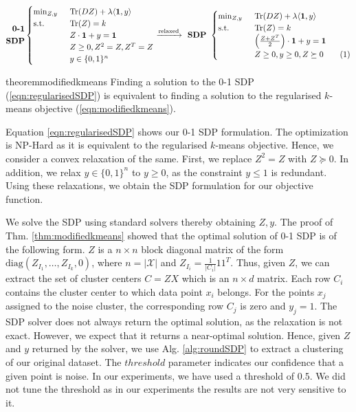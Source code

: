 \documentclass[12pt]{article}
\newcommand{\mc}{\mathcal}
\newcommand{\mb}{\mathbf}
\newcommand{\tr}{\text{Tr}}
\newcommand{\diag}{\text{diag}}
\newcommand\numberthis{\addtocounter{equation}{1}\tag{\theequation}}
\begin{document}
\begin{equation*}
	\begin{split}
	\textbf{0-1}\\
	\textbf{SDP}
  \end{split}
	\begin{cases}
		\min_{Z, y} \enspace &\tr(DZ) + \lambda \langle \mb 1, y\rangle\\
		\text{s.t. } \enspace &\tr(Z) = k\\
		& Z\cdot \mb 1 + y = \mb 1\\	
		&Z\ge 0, Z^2 = Z, Z^T = Z \\
		& y \in \{0, 1\}^n
	\end{cases}
	\xrightarrow{\text{relaxed}} \textbf{ SDP } 
	\begin{cases}
		\min_{Z, y} \enspace &\tr(DZ) + \lambda \langle \mb 1, y\rangle\\
        \text{s.t. } \enspace &\tr(Z) = k\\
		& \Big(\frac{Z+Z^T}{2}\Big)\cdot \mb 1 + y = \mb 1\\		
		&Z \ge 0, y \ge 0, Z \succeq 0 \numberthis\label{eqn:regularisedSDP}
	\end{cases}
\end{equation*}

\begin{restatable}{theorem}{modifiedkmeans}
\label{thm:modifiedkmeans}
Finding a solution to the 0-1 SDP (\ref{eqn:regularisedSDP}) is equivalent to finding a solution to the regularised $k$-means objective (\ref{eqn:modifiedkmeans}). 
\end{restatable}

Equation \ref{eqn:regularisedSDP} shows our 0-1 SDP formulation. The optimization is NP-Hard as it is equivalent to the regularised $k$-means objective. Hence, we consider a convex relaxation of the same. First, we replace $Z^2 = Z$ with $Z \succeq 0$. In addition, we relax $y \in \{0, 1\}^n$ to $y \geq 0$, as the constraint $y\leq 1$ is redundant. Using these relaxations, we obtain the SDP formulation for our objective function.

We solve the SDP using standard solvers \cite{yang2015sdpnal+} thereby obtaining $Z, y$. 
The proof of Thm. \ref{thm:modifiedkmeans} showed that the optimal solution of 0-1 SDP is of the following form. $Z$ is a $n\times n$ block diagonal matrix of the form $\diag(Z_{I_1}, \ldots, Z_{I_k}, 0)$, where $n = |\mc X|$ and $Z_{I_i} = \frac{1}{|C_i|}11^T$. Thus, given $Z$, we can extract the set of cluster centers $C = ZX$ which is an $n \times d$ matrix. Each row $C_i$ contains the cluster center to which data point $x_i$ belongs. For the points $x_j$ assigned to the noise cluster, the corresponding row $C_j$ is zero and $y_j = 1$. The SDP solver does not always return the optimal solution, as the relaxation is not exact. However, we expect that it returns a near-optimal solution. Hence, given $Z$ and $y$ returned by the solver, we use Alg. \ref{alg:roundSDP} to extract a clustering of our original dataset. The $threshold$ parameter indicates our confidence that a given point is noise. In our experiments, we have used a threshold of $0.5$. We did not tune the threshold as in our experiments the results
are not very sensitive to it.
\end{document}
